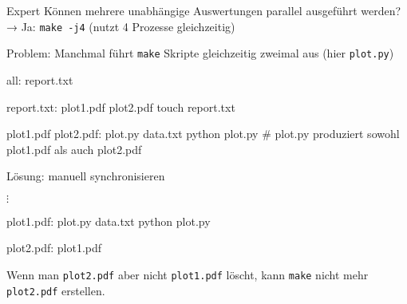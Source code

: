 \begin{frame}[fragile]{Expert}
  Können mehrere unabhängige Auswertungen parallel ausgeführt werden? \\
  → Ja: \texttt{make -j4} (nutzt 4 Prozesse gleichzeitig)

  Problem: Manchmal führt \texttt{make} Skripte gleichzeitig zweimal aus (hier \texttt{plot.py})
  \begin{center}
    \begin{lstmake}
      all: report.txt
 
      report.txt: plot1.pdf plot2.pdf
        touch report.txt

      plot1.pdf plot2.pdf: plot.py data.txt
        python plot.py  # plot.py produziert sowohl plot1.pdf als auch plot2.pdf
    \end{lstmake}
  \end{center}

  Lösung: manuell synchronisieren
  \begin{center}
    $\vdots$ \\
    \begin{lstmake}
      plot1.pdf: plot.py data.txt
          python plot.py

      plot2.pdf: plot1.pdf
    \end{lstmake}
  \end{center}

  Wenn man \texttt{plot2.pdf} aber nicht \texttt{plot1.pdf} löscht, kann \texttt{make} nicht mehr \texttt{plot2.pdf} erstellen.
\end{frame}
